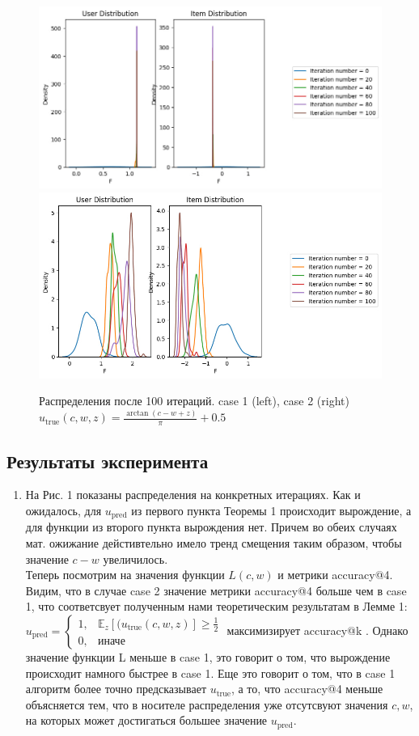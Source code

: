 \documentclass{article}
\begin{document}
\begin{figure}[h!]
    \centering
    \includegraphics[width=0.49\linewidth]{images/distr_utrue1.jpg}
    \includegraphics[width=0.49\linewidth]{images/distr_utrue1_2.jpg}

    \caption{Распределения после 100 итераций. case 1 (left), case 2 (right) \\
    $u_{\text{true}}(c, w, z) = \frac{\arctan(c - w + z)}{\pi} + 0.5$}
    \label{distribtopns}
\end{figure}




\subsection{Результаты эксперимента}
\begin{enumerate}
    \item На Рис. 1 показаны распределения на конкретных итерациях. Как и ожидалось, для $u_{\text{pred}}$ из первого пункта Теоремы 1 происходит вырождение, а для функции из второго пункта вырождения нет. Причем во обеих случаях мат. ожижание дейстивтельно имело тренд смещения таким образом, чтобы значение $c-w$ увеличилось. \\
    Теперь посмотрим на значения функции $L(c, w)$ и метрики accuracy@4.
    Видим, что в случае case 2 значение метрики accuracy@4 больше чем в case 1, что соответсвует полученным нами теоретическим результатам в Лемме 1: $u_{\text{pred}} = \begin{cases}
       1, &\text{$\mathbb{E}_z[(u_{\text{true}}(c, w, z)] \geq \frac{1}{2} $}\\
       0, &\text{иначе}
    \end{cases}$ максимизирует accuracy@k . Однако значение функции L меньше в case 1, это говорит о том, что вырождение происходит намного быстрее в case 1. Еще это говорит о том, что в case 1 алгоритм более точно предсказывает $u_{\text{true}}$, а то, что accuracy@4 меньше объясняется тем, что в носителе распределения уже отсутсвуют значения $c, w$, на которых может достигаться большее значение $u_{\text{pred}}$.
\end{enumerate}
\end{document}

